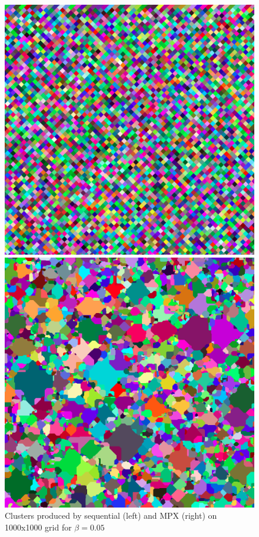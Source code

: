 \documentclass[11pt]{scrartcl}
\theoremstyle{plain}
\theoremstyle{definition}
\theoremstyle{remark}
\begin{document}
\begin{figure}
\begin{minipage}[c]{0.5\textwidth}
\begin{center}
	\includegraphics[scale=0.2]{grid_seq.png}
\end{center}
\end{minipage}
\begin{minipage}[c]{0.5\textwidth}
\begin{center}
	\includegraphics[scale=0.2]{grid_mpx.png}
\end{center}
\end{minipage}
\caption{Clusters produced by sequential (left) and MPX (right) on 1000x1000 grid for $\beta=0.05$}
\label{fig:1}
\end{figure}
\end{document}
